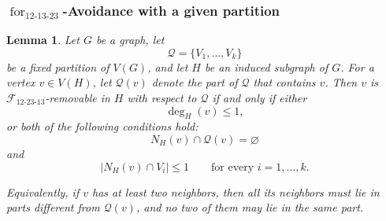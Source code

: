 \documentclass[12pt]{article}
\theoremstyle{plain}
\newtheorem{lemma}[theorem]{Lemma}
\theoremstyle{definition}
\theoremstyle{remark}
\theoremstyle{definition}
\newcommand{\forlabel}{\mathrm{for}}
\DeclareRobustCommand{\forparam}[1]{%
  \ensuremath{\mathop{\forlabel}\nolimits_{#1}}%
}
\begin{document}
\subsubsection{
\texorpdfstring{\(\forparam{12\text{-}13\text{-}23}\)-Avoidance with a given partition}
{for12-13-23-Avoidance with a given partition}
}
\label{subsubsec:for12-13-23-given-partition}



\begin{lemma}\label{lem:removable-for12-23-13}
Let \(G\) be a graph, let
\[
\mathcal Q=\{V_1,\dots,V_k\}
\]
be a fixed partition of \(V(G)\), and let \(H\) be an induced subgraph of \(G\).
For a vertex \(v\in V(H)\), let \(\mathcal Q(v)\) denote the part of \(\mathcal Q\) that contains \(v\).
Then \(v\) is \(\mathcal F_{12\text{-}23\text{-}13}\)-removable in \(H\) with respect to \(\mathcal Q\) if and only if
either
\[
\deg_H(v)\le 1,
\]
or both of the following conditions hold:
\[
N_H(v)\cap \mathcal Q(v)=\varnothing
\]
and
\[
|N_H(v)\cap V_i|\le 1
\qquad\text{for every } i=1,\dots,k.
\]

Equivalently, if \(v\) has at least two neighbors, then all its neighbors must lie in parts different from
\(\mathcal Q(v)\), and no two of them may lie in the same part.
\end{lemma}
\end{document}
